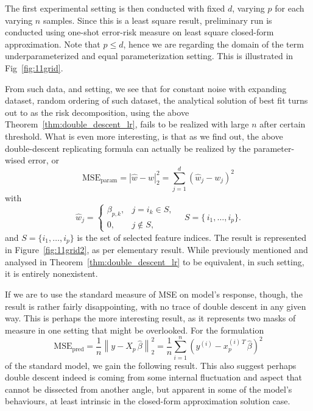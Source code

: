 \documentclass{article}
\begin{document}
The first experimental setting is then conducted with fixed $d$, varying $p$ for each varying $n$ samples. Since this is a least square result, preliminary run is conducted using one-shot error-risk measure on least square closed-form approximation. Note that $p\leq d$, hence we are regarding the domain of the term underparameterized and equal parameterization setting. This is illustrated in Fig~\ref{fig:11grid}.

From such data, and setting, we see that for constant noise with expanding dataset, random ordering of such dataset, the analytical solution of best fit turns out to as the risk decomposition, using the above Theorem~\ref{thm:double_descent_lr}, fails to be realized with large $n$ after certain threshold. What is even more interesting, is that as we find out, the above double-descent replicating formula can actually be realized by the parameter-wised error, or 
\begin{equation}
\mathrm{MSE}_{\mathrm{param}}=\left\lvert \hat w - w \right\rvert _{2}^{2}=
\sum_{j=1}^{d}
\left(
  \hat w_{j} - w_{j}
\right)^{2}
\end{equation}
with 
\begin{equation}
\hat w_{j}
=
\begin{cases}
\beta_{p,k}, & j = i_{k} \in S,\\[6pt]
0,           & j \notin S,
\end{cases}
\quad
S = \{\,i_{1},\dots,i_{p}\}.
\end{equation}
and \(S=\{i_1,\dots,i_p\}\) is the set of selected feature indices. The result is represented in Figure~\ref{fig:11grid2}, as per elementary result. While previously mentioned and analysed in Theorem~\ref{thm:double_descent_lr} to be equivalent, in such setting, it is entirely nonexistent. 

If we are to use the standard measure of MSE on model's response, though, the result is rather fairly disappointing, with no trace of double descent in any given way. This is perhaps the more interesting result, as it represents two masks of measure in one setting that might be overlooked. For the formulation
\begin{equation}
\mathrm{MSE}_{\mathrm{pred}}
=
\frac{1}{n}
\left\lVert
  y - X_{p}\,\hat\beta
\right\rVert_{2}^{2}
=
\frac{1}{n}
\sum_{i=1}^{n}
\left(
  y^{(i)} - x_{p}^{(i)\,T}\,\hat\beta
\right)^{2}
\end{equation}
of the standard model, we gain the following result. This also suggest perhaps double descent indeed is coming from some internal fluctuation and aspect that cannot be dissected from another angle, but apparent in some of the model's behaviours, at least intrinsic in the closed-form approximation solution case. 
\end{document}
